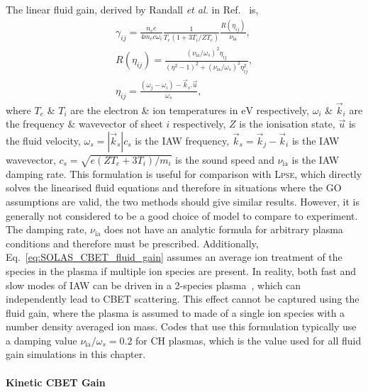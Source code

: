 The linear fluid gain, derived by Randall \textit{et al.} in Ref.~\cite{randall_theory_1981} is,
\begin{equation}
    \label{eq:SOLAS_CBET_fluid_gain}
    \begin{gathered}
        \gamma_{ij} = \frac{n_e e}{4 m_e c \omega_i} \frac{1}{T_e \left( 1 + 3 T_i / Z T_e \right)} \frac{R(\eta_{ij})}{\nu_{\text{ia}}}, \\
        R(\eta_{ij}) = \frac{ (\nu_{\text{ia}}/\omega_{s})^2 \eta_{ij} } { (\eta^2 - 1)^2 + (\nu_{\text{ia}}/\omega_s)^2 \eta_{ij}^2 }, \\
        \eta_{ij} = \frac{ (\omega_j-\omega_i) - \vec{k}_s.\vec{u} }{\omega_s},
    \end{gathered}
\end{equation}
where $T_e$ \& $T_i$ are the electron \& ion temperatures in $\text{eV}$ respectively, $\omega_i$ \& $\vec{k}_i$ are the frequency \& wavevector of sheet $i$ respectively, $Z$ is the ionisation state, $\vec{u}$ is the fluid velocity, $\omega_s = |\vec{k}_s|c_s$ is the \ac{IAW} frequency, $\vec{k}_s = \vec{k}_j - \vec{k}_i$ is the \ac{IAW} wavevector, $c_s = \sqrt{e(Z T_e + 3 T_i)/m_i}$ is the sound speed and $\nu_{\text{ia}}$ is the \ac{IAW} damping rate.
This formulation is useful for comparison with \textsc{Lpse}, which directly solves the linearised fluid equations and therefore in situations where the \ac{GO} assumptions are valid, the two methods should give similar results.
However, it is generally not considered to be a good choice of model to compare to experiment.
The damping rate, $\nu_{\text{ia}}$ does not have an analytic formula for arbitrary plasma conditions and therefore must be prescribed.
Additionally, Eq.~\ref{eq:SOLAS_CBET_fluid_gain} assumes an average ion treatment of the species in the plasma if multiple ion species are present.
In reality, both fast and slow modes of \ac{IAW} can be driven in a 2-species plasma~\cite{williams_frequency_1995}, which can independently lead to \ac{CBET} scattering.
This effect cannot be captured using the fluid gain, where the plasma is assumed to made of a single ion species with a number density averaged ion mass.
Codes that use this formulation typically use a damping value $\nu_{\text{ia}}/\omega_s=0.2$ for CH plasmas, which is the value used for all fluid gain simulations in this chapter.

\paragraph*{Kinetic CBET Gain}

